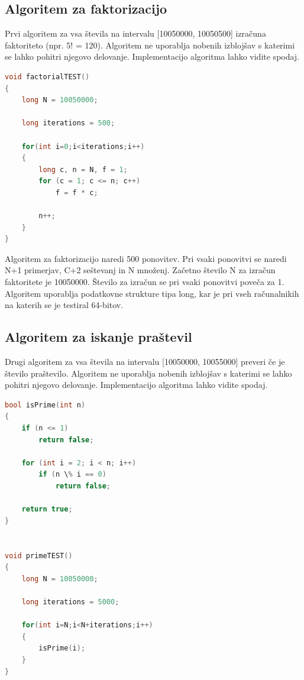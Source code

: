 \subsection{Algoritem za faktorizacijo}

Prvi algoritem za vsa števila na intervalu [10050000, 10050500] izračuna faktoriteto (npr. 5! = 120). Algoritem ne uporablja nobenih izblojšav s katerimi se lahko pohitri njegovo delovanje. Implementacijo algoritma lahko vidite spodaj.

\begin{lstlisting}[language=C++, caption=Algoritem faktoritet, label={lst:alg1}]
void factorialTEST()
{
    long N = 10050000;

    long iterations = 500;

	for(int i=0;i<iterations;i++)
	{
		long c, n = N, f = 1;
		for (c = 1; c <= n; c++)
			f = f * c;

		n++;
	}
}
\end{lstlisting} 

Algoritem za faktorizacijo naredi 500 ponovitev. Pri vsaki ponovitvi se naredi N+1 primerjav, C+2 seštevanj in N množenj. Začetno število N za izračun faktoritete je 10050000. Število za izračun se pri vsaki ponovitvi poveča za 1. Algoritem uporablja podatkovne strukture tipa long, kar je pri vseh računalnikih na katerih se je testiral 64-bitov. 

\subsection{Algoritem za iskanje praštevil}

Drugi algoritem za vsa števila na intervalu [10050000, 10055000] preveri če je število praštevilo. Algoritem ne uporablja nobenih izblojšav s katerimi se lahko pohitri njegovo delovanje. Implementacijo algoritma lahko vidite spodaj.

\begin{lstlisting}[language=C++, caption=Algoritem faktoritet, label={lst:alg2}]
bool isPrime(int n)
{
    if (n <= 1)
        return false;

    for (int i = 2; i < n; i++)
        if (n \% i == 0)
            return false;

    return true;
}


void primeTEST()
{
	long N = 10050000;

	long iterations = 5000;

	for(int i=N;i<N+iterations;i++)
	{
		isPrime(i);
	}
}
\end{lstlisting} 


